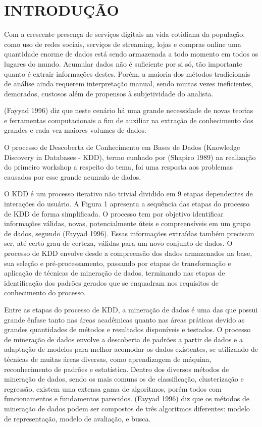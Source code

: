 
\chapter{INTRODUÇÃO}
\label{chap:introducao}

Com a crescente presença de serviços digitais na vida cotidiana da população, como uso de redes sociais, serviços de streaming, lojas e compras online uma quantidade enorme de dados está sendo armazenada a todo momento em todos os lugares do mundo. Acumular dados não é suficiente por si só, tão importante quanto é extrair informações destes. Porém, a maioria dos métodos tradicionais de análise ainda requerem interpretação manual, sendo muitas vezes ineficientes, demorados, custosos além de propensos à subjetividade do analista.

(Fayyad 1996) diz que neste cenário há uma grande necessidade de novas teorias e ferramentas computacionais a fim de auxiliar na extração de conhecimento dos grandes e cada vez maiores volumes de dados.

O processo de Descoberta de Conhecimento em Bases de Dados (Knowledge Discovery in Databases - KDD), termo cunhado por (Shapiro 1989) na realização do primeiro workshop a respeito do tema, foi uma resposta aos problemas causados por esse grande acumulo de dados.

O KDD é um processo iterativo não trivial dividido em 9 etapas dependentes de interações do usuário. A Figura 1 apresenta a sequência das etapas do processo de KDD de forma simplificada. O processo tem por objetivo identificar informações válidas, novas, potencialmente úteis e compreensíveis em um grupo de dados, segundo (Fayyad 1996). Essas informações extraídas também precisam ser, até certo grau de certeza, válidas para um novo conjunto de dados. O processo de KDD envolve desde a compreensão dos dados armazenados na base, sua seleção e pré-processamento, passando por etapas de transformação e aplicação de técnicas de mineração de dados, terminando nas etapas de identificação dos padrões gerados que se enquadram nos requisitos de conhecimento do processo.

Entre as etapas do processo de KDD, a mineração de dados é uma das que possui grande ênfase tanto nas áreas acadêmicas quanto nas áreas práticas devido as grandes quantidades de métodos e resultados disponíveis e testados. O processo de mineração de dados envolve a descoberta de padrões a partir de dados e a adaptação de modelos para melhor acomodar os dados existentes, se utilizando de técnicas de muitas áreas diversas, como aprendizagem de máquina, reconhecimento de padrões e estatística. Dentro dos diversos métodos de mineração de dados, sendo os mais comuns os de classificação, clusterização e regressão, existem uma extensa gama de algoritmos, porém todos com funcionamentos e fundamentos parecidos. (Fayyad 1996) diz que os métodos de mineração de dados podem ser compostos de três algoritmos diferentes: modelo de representação, modelo de avaliação, e busca.
	
